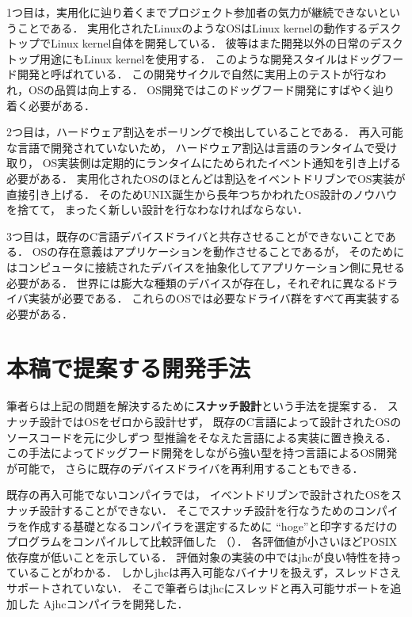 \documentclass[submit,techreq,noauthor]{ipsj}
\begin{document}
1つ目は，実用化に辿り着くまでプロジェクト参加者の気力が継続できないということである．
実用化されたLinuxのようなOSはLinux kernelの動作するデスクトップでLinux kernel自体を開発している．
彼等はまた開発以外の日常のデスクトップ用途にもLinux kernelを使用する．
このような開発スタイルはドッグフード開発と呼ばれている．
この開発サイクルで自然に実用上のテストが行なわれ，OSの品質は向上する．
OS開発ではこのドッグフード開発にすばやく辿り着く必要がある．

2つ目は，ハードウェア割込をポーリングで検出していることである．
再入可能な言語で開発されていないため，
ハードウェア割込は言語のランタイムで受け取り，
OS実装側は定期的にランタイムにためられたイベント通知を引き上げる必要がある．
実用化されたOSのほとんどは割込をイベントドリブンでOS実装が直接引き上げる．
そのためUNIX誕生から長年つちかわれたOS設計のノウハウを捨てて，
まったく新しい設計を行なわなければならない．

3つ目は，既存のC言語デバイスドライバと共存させることができないことである．
OSの存在意義はアプリケーションを動作させることであるが，
そのためにはコンピュータに接続されたデバイスを抽象化してアプリケーション側に見せる必要がある．
世界には膨大な種類のデバイスが存在し，それぞれに異なるドライバ実装が必要である．
これらのOSでは必要なドライバ群をすべて再実装する必要がある．

\section{本稿で提案する開発手法}

筆者らは上記の問題を解決するために\textbf{スナッチ設計}という手法を提案する．
スナッチ設計ではOSをゼロから設計せず，
既存のC言語によって設計されたOSのソースコードを元に少しずつ
型推論をそなえた言語による実装に置き換える．
この手法によってドッグフード開発をしながら強い型を持つ言語によるOS開発が可能で，
さらに既存のデバイスドライバを再利用することもできる．

既存の再入可能でないコンパイラでは，
イベントドリブンで設計されたOSをスナッチ設計することができない．
そこでスナッチ設計を行なうためのコンパイラを作成する基礎となるコンパイラを選定するために
``hoge''と印字するだけのプログラムをコンパイルして比較評価した
（）．
各評価値が小さいほどPOSIX依存度が低いことを示している．
評価対象の実装の中ではjhc\cite{jhc}が良い特性を持っていることがわかる．
しかしjhcは再入可能なバイナリを扱えず，スレッドさえサポートされていない．
そこで筆者らはjhcにスレッドと再入可能サポートを追加した
Ajhcコンパイラを開発した\cite{j-ikamusume5}．
\end{document}
